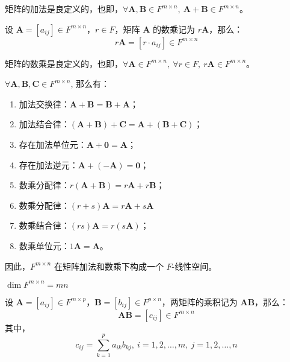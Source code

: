 \begin{proposition}
    矩阵的加法是良定义的，也即，$\forall \mathbf{A},\mathbf{B}\in F^{m \times n},\ \mathbf{A}+\mathbf{B}\in F^{m \times n}$。
\end{proposition}

\begin{definition}
    设 $\mathbf{A} = [a_{ij}] \in F^{m \times n}$，$r\in F$，矩阵 $\mathbf{A}$ 的数乘记为 $r\mathbf{A}$，那么：
    \[
       r\mathbf{A} = [r \cdot a_{ij}] \in F^{m \times n}
    \]
\end{definition}

\begin{proposition}
    矩阵的数乘是良定义的，也即，$\forall \mathbf{A}\in F^{m \times n},\ \forall r\in F,\ r\mathbf{A}\in F^{m \times n}$。
\end{proposition}

\begin{proposition}[矩阵线性空间]
    $\forall \mathbf{A}, \mathbf{B},\mathbf{C} \in F^{m\times n}$, 那么有：
    \begin{enumerate}
        \item 加法交换律：$\mathbf{A} + \mathbf{B} = \mathbf{B} + \mathbf{A}$；
        \item 加法结合律：$(\mathbf{A} + \mathbf{B}) + \mathbf{C} = \mathbf{A} + (\mathbf{B} + \mathbf{C})$；
        \item 存在加法单位元：$\mathbf{A} + \mathbf{0} = \mathbf{A}$；
        \item 存在加法逆元：$\mathbf{A} + (-\mathbf{A}) = \mathbf{0}$；
        \item 数乘分配律：$r(\mathbf{A} + \mathbf{B}) = r\mathbf{A} + r\mathbf{B}$；
        \item 数乘分配律：$(r+s)\mathbf{A} = r\mathbf{A} + s\mathbf{A}$
        \item 数乘结合律：$(rs)\mathbf{A} = r(s\mathbf{A})$；
        \item 数乘单位元：$1\mathbf{A} = \mathbf{A}$。
    \end{enumerate}
    因此，$F^{m \times n}$ 在矩阵加法和数乘下构成一个 $F$-线性空间。
\end{proposition}

\begin{proposition}[矩阵线性空间的维度]
    $\dim F^{m \times n} = mn$
\end{proposition}


\begin{definition}
    设 $\mathbf{A} = [a_{ij}] \in F^{m \times p}$，$\mathbf{B} = [b_{ij}] \in F^{p \times n}$，两矩阵的乘积记为 $\mathbf{A}\mathbf{B}$，那么：
    \[
       \mathbf{A}\mathbf{B} = [c_{ij}] \in F^{m \times n}
    \]
    其中，
    \[
        c_{ij} = \sum_{k=1}^{p} a_{ik} b_{kj},\ i=1,2,\ldots,m,\ j=1,2,\ldots,n
    \]
\end{definition}

